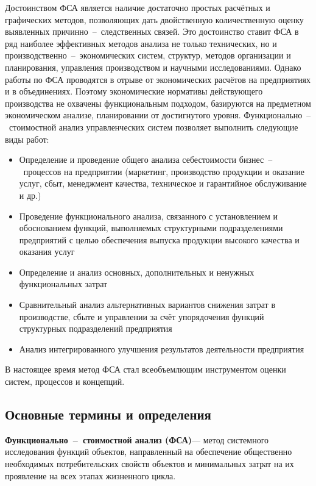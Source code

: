 Достоинством ФСА является наличие достаточно простых расчётных и графических
методов, позволяющих дать двойственную количественную оценку выявленных
причинно~--~следственных связей. Это достоинство ставит ФСА в ряд наиболее
эффективных методов анализа не только технических, но и
производственно~--~экономических систем, структур, методов организации и
планирования, управления производством и научными исследованиями. Однако работы
по ФСА проводятся в отрыве от экономических расчётов на предприятиях и в
объединениях.
Поэтому экономические нормативы действующего производства не охвачены
функциональным подходом, базируются на предметном экономическом анализе,
планировании от достигнутого уровня.
Функционально~--~стоимостной анализ управленческих систем позволяет выполнить
следующие виды работ:
\begin{itemize}
    \item Определение и проведение общего анализа себестоимости
    бизнес~--~процессов на предприятии (маркетинг, производство продукции и
    оказание услуг, сбыт, менеджмент качества, техническое и гарантийное
    обслуживание и др.)
    \item Проведение функционального анализа, связанного с установлением и
    обоснованием функций, выполняемых структурными подразделениями предприятий с
    целью обеспечения выпуска продукции высокого качества и оказания услуг
    \item Определение и анализ основных, дополнительных и ненужных
    функциональных затрат
    \item Сравнительный анализ альтернативных вариантов снижения затрат в
    производстве, сбыте и управлении за счёт упорядочения функций структурных
    подразделений предприятия
    \item Анализ интегрированного улучшения результатов деятельности
предприятия
\end{itemize}

В настоящее время метод ФСА стал всеобъемлющим инструментом
оценки систем, процессов и концепций.

\newpage
\subsection{Основные термины и определения}

\textbf{Функционально~--~стоимостной анализ (ФСА)}--- метод системного
исследования функций объектов, направленный на обеспечение общественно
необходимых потребительских свойств объектов и минимальных затрат на их
проявление на всех этапах жизненного цикла.

